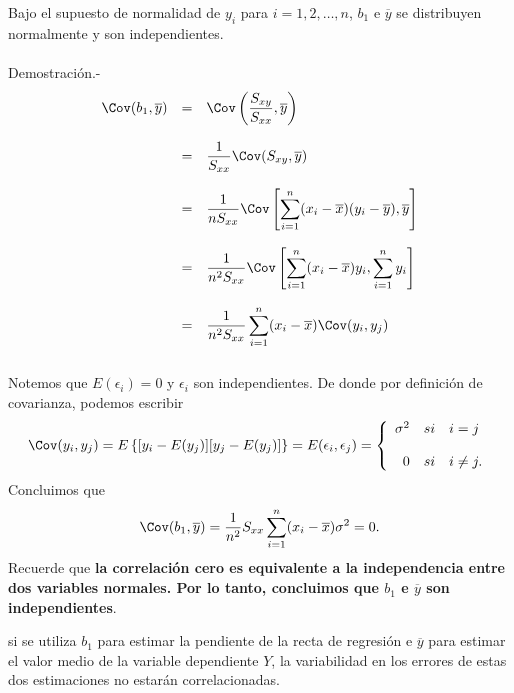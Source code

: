 \begin{teo} Bajo el supuesto de normalidad de $y_i$ para $i = 1, 2, \ldots , n$, $b_1$ e $\overline{y}$ se distribuyen normalmente y son independientes.\\\\
    Demostración.-\; 
    $$
    \begin{array}{rcl}
	\Cov(b_1,\overline{y}) &=& \Cov\left(\dfrac{S_{xy}}{S_{xx}},\overline{y}\right)\\\\
			       &=& \dfrac{1}{S_{xx}}\Cov(S_{xy},\overline{y})\\\\
			       &=& \dfrac{1}{nS_{xx}}\Cov\left[\displaystyle\sum_{i=1}^n(x_i-\overline{x})(y_i-\overline{y}),\overline{y}\right]\\\\
			       &=& \dfrac{1}{n^2S_{xx}}\Cov\left[\displaystyle\sum_{i=1}^n (x_i-\overline{x})y_i,\displaystyle\sum_{i=1}^n y_i\right]\\\\
			       &=& \dfrac{1}{n^2S_{xx}}\displaystyle\sum_{i=1}^n (x_i-\overline{x})\Cov(y_i,y_j)\\\\
    \end{array}
    $$
    Notemos que $E(\epsilon_i)=0$ y $\epsilon_i$ son independientes. De donde por definición de covarianza, podemos escribir
    $$\Cov(y_i,y_j)=E\left\{[y_i-E(y_j)][y_j-E(y_j)]\right\}=E(\epsilon_i,\epsilon_j)=
    \left\{
	\begin{array}{rcl}
	    \sigma^2 &si& i=j\\\\
	    0 &si& i\neq j.
	\end{array}
    \right.
    $$
    Concluimos que
    $$\Cov(b_1,\overline{y})=\dfrac{1}{n^2}{S_{xx}}\sum_{i=1}^n (x_i-\overline{x})\sigma^2=0.$$
    Recuerde que \textbf{la correlación cero es equivalente a la independencia entre dos variables normales. Por lo tanto, concluimos que \boldmath $b_1$ e $\overline{y}$ son independientes}.
\end{teo}

 si se utiliza $b_1$ para estimar la pendiente de la recta de regresión e $\overline{y}$ para estimar el valor medio de la variable dependiente $Y$, la variabilidad en los errores de estas dos estimaciones no estarán correlacionadas.

